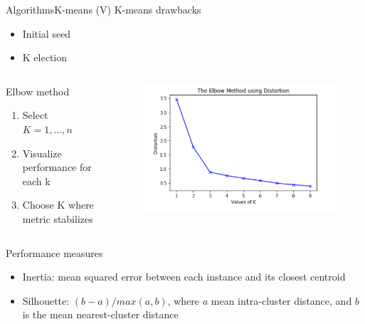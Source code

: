 \documentclass[10pt,compress]{beamer} %
\begin{document}
\begin{frame}[fragile]{Algorithms}{K-means (V)}
    K-means drawbacks
    \begin{itemize}
        \item Initial seed
        \item K election
    \end{itemize}

    \begin{columns}
        \begin{block}{Elbow method}
           \begin{enumerate}
            \item Select $K=1, ..., n$
            \item Visualize performance for each k
            \item Choose K where metric stabilizes
           \end{enumerate} 
        \end{block}
			\begin{figure}
		        \includegraphics[width=\textwidth]{figs/elbow.png}
			\end{figure}
    \end{columns}

    Performance measures
    \begin{itemize}       
        \item Inertia: mean squared error between each instance and its closest centroid
        \item Silhouette: $(b-a) / max (a, b)$, where $a$ mean intra-cluster distance, and $b$ is the mean nearest-cluster distance
    \end{itemize}       
\end{frame}
\end{document}
